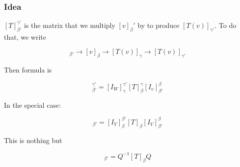 \documentclass{article}
\newtheorem{one minute paper}[theorem]{One Minute Paper}
\begin{document}
\subsubsection*{Idea}

$[T]_{\beta'}^{\gamma'}$ is the matrix that we multiply $[v]_\beta'$ by to produce $[T(v)]_{\gamma'}$. To do that, we write 

\begin{equation}
    [v]_{\beta'} \rightarrow [v]_{\beta} \rightarrow [T(v)]_\gamma \rightarrow [T(v)]_{\gamma'}
\end{equation}

Then formula is 

\begin{equation}
    [T]_{\beta'}^{\gamma'} = [I_W]_{\gamma}^{\gamma'}[T]_{\beta}^{\gamma}[I_v]_{\beta'}^{\beta}
\end{equation}

In the special case:

\begin{equation}
    [T]_{\beta'} = [I_V]_{\beta}^{\beta'}[T]_\beta[I_V]_{\beta'}^{\beta}
\end{equation}

This is nothing but 

\begin{equation}
    [T]_{\beta'} = Q^{-1}[T]_\beta Q
\end{equation}
\end{document}
